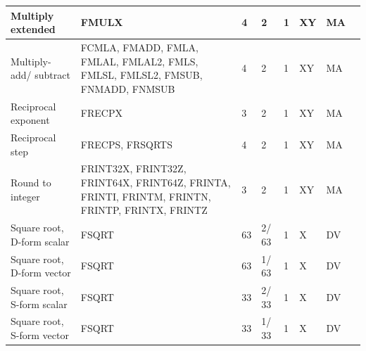 \begin{longtable}{|p{1in}|p{1in}|l|l|l|p{1in}|l|p{1in}|}
\hline
Multiply extended & FMULX & 4 & 2 & 1 & XY & MA & \\
\hline
Multiply-add/ subtract & FCMLA, FMADD, FMLA, FMLAL, FMLAL2, FMLS, FMLSL, FMLSL2, FMSUB, FNMADD, FNMSUB & 4 & 2 & 1 & XY & MA & \\
\hline
Reciprocal exponent & FRECPX & 3 & 2 & 1 & XY & MA & \\
\hline
Reciprocal step & FRECPS, FRSQRTS & 4 & 2 & 1 & XY & MA & \\
\hline
Round to integer & FRINT32X, FRINT32Z, FRINT64X, FRINT64Z, FRINTA, FRINTI, FRINTM, FRINTN, FRINTP, FRINTX, FRINTZ & 3 & 2 & 1 & XY & MA & \\
\hline
Square root, D-form scalar & FSQRT & 63 & 2/ 63 & 1 & X & DV & \\
\hline
Square root, D-form vector & FSQRT & 63 & 1/ 63 & 1 & X & DV & \\
\hline
Square root, S-form scalar & FSQRT & 33 & 2/ 33 & 1 & X & DV & \\
\hline
Square root, S-form vector & FSQRT & 33 & 1/ 33 & 1 & X & DV & \\
\hline
\end{longtable}
